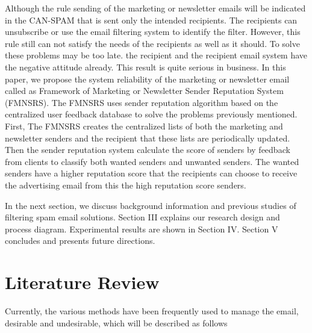 \documentclass[conference]{IEEEtran}
\begin{document}
Although the rule sending of the marketing or newsletter emails will be indicated in the CAN-SPAM that is sent only the intended recipients.
The recipients can unsubscribe or use the email filtering system to identify the filter. 
However, this rule still can not satisfy the needs of the recipients as well as it should.
To solve these problems may be too late. 
the recipient and the recipient email system have the negative attitude already. This result is quite serious in business.
%
In this paper, we propose the system reliability of the marketing or newsletter email called as Framework of Marketing or Newsletter Sender Reputation System (FMNSRS).  
The FMNSRS uses sender reputation algorithm based on the centralized user feedback database to solve the problems previously mentioned.
First, The FMNSRS creates the centralized lists of both the marketing and newsletter senders and the recipient that these lists are periodically updated.
Then the sender reputation system calculate the score of senders by feedback from clients to classify both wanted senders and unwanted senders. 
The wanted senders have a higher reputation score that the recipients can choose to receive the advertising email from this the high reputation score senders.

In the next section, we discuss background information and previous studies of filtering spam email solutions. 
Section III explains our research design and process diagram. 
Experimental results are shown in Section IV.
Section V concludes and presents future directions.
%

\section{Literature Review}
Currently, the various methods \cite{levine, Sochor, Lazzari, DBLP:taylor, wong, NguyenTuanAnh, Seike, crocker, Leiba, Higashikado, upasana, XiaoJunyong, falk, FalkKucherawy, gmail} have been frequently used to manage the email, desirable and undesirable, which will be described as follows
\end{document}
